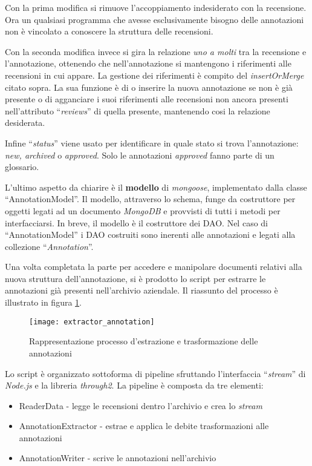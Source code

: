 Con la prima modifica si rimuove l'accoppiamento indesiderato con la recensione.
Ora un qualsiasi programma che avesse esclusivamente bisogno delle annotazioni
non è vincolato a conoscere la struttura delle recensioni.

Con la seconda modifica invece si gira la relazione \textit{uno a molti} tra
la recensione e l'annotazione, ottenendo che nell'annotazione si mantengono i
riferimenti alle recensioni in cui appare. La gestione dei riferimenti è
compito del \textit{insertOrMerge} citato sopra. La sua funzione è di o inserire
la nuova annotazione se non è già presente o di agganciare i suoi riferimenti 
alle recensioni non ancora presenti nell'attributo ``\textit{reviews}'' di 
quella presente, mantenendo cosi la relazione desiderata.

Infine ``\textit{status}'' viene usato per identificare in quale stato si trova
l'annotazione: \textit{new, archived} o \textit{approved}. Solo le annotazioni
\textit{approved} fanno parte di un glossario.

L'ultimo aspetto da chiarire è il \textbf{modello} di \textit{mongoose},
implementato dalla classe ``AnnotationModel''. Il modello, attraverso lo schema,
funge da costruttore per oggetti legati ad un documento \textit{MongoDB} e
provvisti di tutti i metodi per interfacciarsi. In breve, il modello è il
costruttore dei \gls{DAO}. Nel caso di ``AnnotationModel'' i \gls{DAO}
costruiti sono inerenti alle annotazioni e legati alla collezione
``\textit{Annotation}''.

Una volta completata la parte per accedere e manipolare documenti relativi
alla nuova struttura dell'annotazione, si è prodotto lo \gls{script} per
estrarre le annotazioni già presenti nell'archivio aziendale. Il riassunto del
processo è illustrato in figura \ref{fig:extractor_annotation}.

\begin{figure}[H]
\begin{center}
\texttt{[image: extractor\_annotation]}
\caption{
Rappresentazione processo d'estrazione e trasformazione delle annotazioni
}
\label{fig:extractor_annotation}
\end{center}
\end{figure}

Lo script è organizzato sottoforma di \gls{pipeline} sfruttando l'interfaccia
``\textit{stream}'' di \textit{Node.js} e la libreria \textit{through2}. La
\gls{pipeline} è composta da tre elementi:
\begin{itemize}
\item ReaderData - legge le recensioni dentro l'archivio e crea lo
\textit{stream}
\item AnnotationExtractor - estrae e applica le debite trasformazioni alle
annotazioni
\item AnnotationWriter - scrive le annotazioni nell'archivio
\end{itemize}

